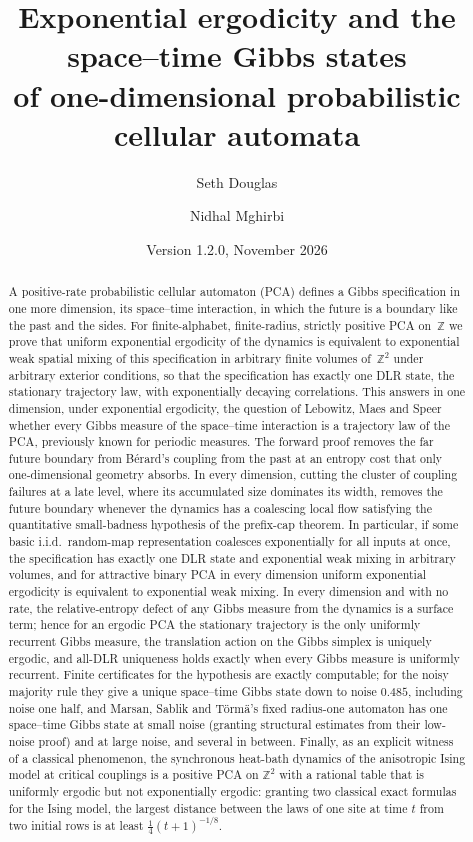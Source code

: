 \documentclass[11pt]{article}
\title{\vspace{-1.2cm}\LARGE Exponential ergodicity and the space--time Gibbs states\\ of one-dimensional probabilistic cellular automata}
\author{Seth Douglas \and Nidhal Mghirbi}
\date{\small Version 1.2.0, November 2026}
\theoremstyle{plain}
\theoremstyle{definition}
\theoremstyle{remark}
\newcommand{\Z}{\mathbb{Z}}
\begin{document}
\maketitle

\begin{abstract}
\noindent
A positive-rate probabilistic cellular automaton (PCA) defines a Gibbs specification in one more dimension, its space--time interaction, in which the future is a boundary like the past and the sides. For finite-alphabet, finite-radius, strictly positive PCA on~$\Z$ we prove that uniform exponential ergodicity of the dynamics is equivalent to exponential weak spatial mixing of this specification in arbitrary finite volumes of~$\Z^2$ under arbitrary exterior conditions, so that the specification has exactly one DLR state, the stationary trajectory law, with exponentially decaying correlations. This answers in one dimension, under exponential ergodicity, the question of Lebowitz, Maes and Speer whether every Gibbs measure of the space--time interaction is a trajectory law of the PCA, previously known for periodic measures. The forward proof removes the far future boundary from B\'erard's coupling from the past at an entropy cost that only one-dimensional geometry absorbs. In every dimension, cutting the cluster of coupling failures at a late level, where its accumulated size dominates its width, removes the future boundary whenever the dynamics has a coalescing local flow satisfying the quantitative small-badness hypothesis of the prefix-cap theorem. In particular, if some basic i.i.d.\ random-map representation coalesces exponentially for all inputs at once, the specification has exactly one DLR state and exponential weak mixing in arbitrary volumes, and for attractive binary PCA in every dimension uniform exponential ergodicity is equivalent to exponential weak mixing. In every dimension and with no rate, the relative-entropy defect of any Gibbs measure from the dynamics is a surface term; hence for an ergodic PCA the stationary trajectory is the only uniformly recurrent Gibbs measure, the translation action on the Gibbs simplex is uniquely ergodic, and all-DLR uniqueness holds exactly when every Gibbs measure is uniformly recurrent. Finite certificates for the hypothesis are exactly computable; for the noisy majority rule they give a unique space--time Gibbs state down to noise $0.485$, including noise one half, and Marsan, Sablik and T\"orm\"a's fixed radius-one automaton has one space--time Gibbs state at small noise (granting structural estimates from their low-noise proof) and at large noise, and several in between. Finally, as an explicit witness of a classical phenomenon, the synchronous heat-bath dynamics of the anisotropic Ising model at critical couplings is a positive PCA on $\Z^2$ with a rational table that is uniformly ergodic but not exponentially ergodic: granting two classical exact formulas for the Ising model, the largest distance between the laws of one site at time $t$ from two initial rows is at least $\frac14(t+1)^{-1/8}$.
\end{abstract}
\end{document}
